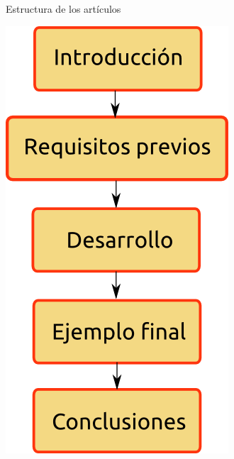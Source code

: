 \documentclass[green]{beamer}
\begin{document}
    
\begin{frame}{Estructura de los artículos}
    
    \begin{center}
	\includegraphics[scale=0.5]{img/bloques-articulos.png}
    \end{center}

\end{frame}
    
    
\end{document}
